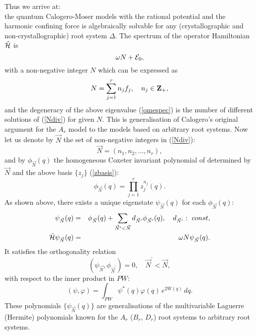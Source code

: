 \documentclass[a4paper,12pt]{article}
\begin{document}
\bigskip
Thus we arrive at:\\
the quantum Calogero-Moser models with the rational potential and the
harmonic confining force is algebraically solvable for any
(crystallographic and non-crystallographic) root system \(\Delta\).
The spectrum of the operator Hamiltonian \(\hat{\cal H}\) is
\begin{equation}
   \omega N+{\cal E}_0,
   \label{omespec}
\end{equation}
with a non-negative integer \(N\) which can be expressed as
\begin{equation}
   N=\sum_{j=1}^rn_j f_j,\quad n_j\in{\bf Z}_+,
   \label{Ndiv}
\end{equation}
and
the degeneracy of the above eigenvalue (\ref{omespec}) is the number
of different solutions of (\ref{Ndiv}) for given \(N\).
This is generalisation of Calogero's original argument
for the \(A_r\) model \cite{Cal} to
the models based on arbitrary root systems.
Now let us denote by $\vec{N}$ the set of non-negative integers in
(\ref{Ndiv}):
\begin{equation}
   \vec{N}=(n_1,n_2,\ldots,n_r),
   \label{Nvec}
\end{equation}
and by $\phi_{\vec{N}}(q)$ the homogeneous Coxeter invariant polynomial
of determined by $\vec{N}$ and the above basis $\{z_j\}$ (\ref{zbasis}):
\begin{equation}
\phi_{\vec{N}}(q)=\prod_{j=1}^rz_j^{n_j}(q).
\end{equation}
As shown above, there exists a unique eigenstate $\psi_{\vec{N}}(q)$ for
each $\phi_{\vec{N}}(q)$:
\begin{eqnarray}
\psi_{\vec{N}}(q)&=&\phi_{\vec{N}}(q)+\sum_{\vec{N}^\prime<\vec{N}}
d_{\vec{N}^\prime} \phi_{\vec{N}^\prime}(q),\quad d_{\vec{N}^\prime}:\
const,\\
 \tilde{\cal H}\psi_{\vec{N}}(q)&=&\omega N\psi_{\vec{N}}(q).
\end{eqnarray}
It satisfies the orthogonality relation
\begin{equation}
(\psi_{\vec{N}},\phi_{\vec{N}^\prime})=0,\quad \vec{N}^\prime<\vec{N},
\end{equation}
with respect to the inner product in $PW$:
\begin{equation}
(\psi,\varphi)=\int_{PW}\psi^*(q)\varphi(q)\,e^{2W(q)}\,dq.
\end{equation}
These polynomials $\{\psi_{\vec{N}}(q)\}$ are generalisations of the
multivariable Laguerre (Hermite) polynomials \cite{Lass} known for the
$A_r$ ($B_r$, $D_r$) root systems to arbitrary root systems.
\end{document}
